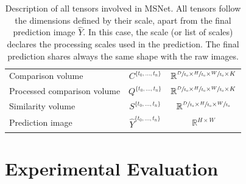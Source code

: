\documentclass[runningheads]{llncs}
\begin{document}
\begin{table}[t]
\begin{tabular}{ l|c|c }
    Comparison volume & $C^{ \{ t_0, ... , t_n \} }$ & $ \mathbb{R}^{ \sfrac{D}{t_0} \times \sfrac{H}{t_0} \times \sfrac{W}{t_0} \times K }  $ \rule{0pt}{3ex} \\
    
    Processed comparison volume & $Q^{ \{ t_0, ... , t_n \} }$ & $ \mathbb{R}^{ \sfrac{D}{t_0} \times \sfrac{H}{t_0} \times \sfrac{W}{t_0} \times K }  $ \rule{0pt}{3ex} \\
    
    Similarity volume & $S^{ \{ t_0, ... , t_n \} }$ & $ \mathbb{R}^{ \sfrac{D}{t_0} \times \sfrac{H}{t_0} \times \sfrac{W}{t_0}} $ \rule{0pt}{3.5ex} \\
    
    Prediction image & $\hat{Y}^{ \{ t_0, ... , t_n \} }$ & $\mathbb{R}^{ H \times W}$ \rule{0pt}{3.5ex} \\
    \hline
    \end{tabular}
    \caption{Description of all tensors involved in MSNet. All tensors follow the dimensions defined by their scale, apart from the final prediction image $\hat{Y}$. In this case, the scale (or list of scales) declares the processing scales used in the prediction. The final prediction shares always the same shape with the raw images.}
    \label{tab:entity_description}
\end{table}

\section{Experimental Evaluation}
\end{document}
